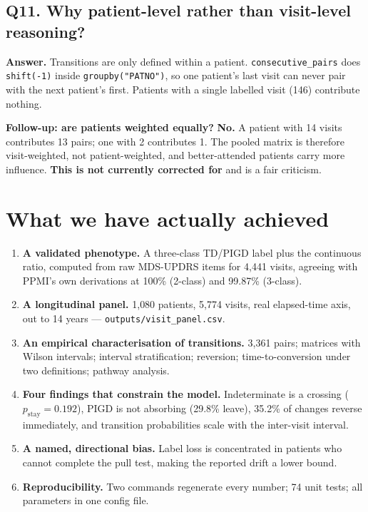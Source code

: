 \documentclass[11pt,a4paper]{article}
\newcommand{\code}[1]{\texttt{\small #1}}
\begin{document}
\subsection*{Q11. Why patient-level rather than visit-level reasoning?}
\textbf{Answer.} Transitions are only defined within a patient.
\code{consecutive\_pairs} does \code{shift(-1)} inside
\code{groupby("PATNO")}, so one patient's last visit can never pair with the
next patient's first. Patients with a single labelled visit (146) contribute
nothing.

\textbf{Follow-up: are patients weighted equally?} \textbf{No.} A patient with
14 visits contributes 13 pairs; one with 2 contributes 1. The pooled matrix is
therefore visit-weighted, not patient-weighted, and better-attended patients
carry more influence. \textbf{This is not currently corrected for} and is a
fair criticism.

\section{What we have actually achieved}

\begin{enumerate}
  \item \textbf{A validated phenotype.} A three-class TD/PIGD label plus the
        continuous ratio, computed from raw MDS-UPDRS items for 4{,}441 visits,
        agreeing with PPMI's own derivations at 100\% (2-class) and 99.87\%
        (3-class).
  \item \textbf{A longitudinal panel.} 1{,}080 patients, 5{,}774 visits, real
        elapsed-time axis, out to 14 years --- \code{outputs/visit\_panel.csv}.
  \item \textbf{An empirical characterisation of transitions.} 3{,}361 pairs;
        matrices with Wilson intervals; interval stratification; reversion;
        time-to-conversion under two definitions; pathway analysis.
  \item \textbf{Four findings that constrain the model.} Indeterminate is a
        crossing ($p_{\text{stay}} = 0.192$), PIGD is not absorbing (29.8\%
        leave), 35.2\% of changes reverse immediately, and transition
        probabilities scale with the inter-visit interval.
  \item \textbf{A named, directional bias.} Label loss is concentrated in
        patients who cannot complete the pull test, making the reported drift a
        lower bound.
  \item \textbf{Reproducibility.} Two commands regenerate every number;
        74 unit tests; all parameters in one config file.
\end{enumerate}
\end{document}
